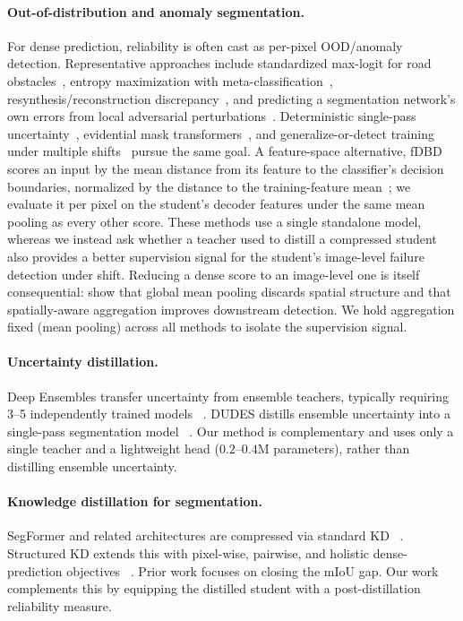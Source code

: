\documentclass{article}
\begin{document}
\paragraph{Out-of-distribution and anomaly segmentation.} For dense prediction, reliability is often cast as per-pixel OOD/anomaly detection. Representative approaches include standardized max-logit for road obstacles~\cite{jung2021standardized}, entropy maximization with meta-classification~\cite{chan2021entropy}, resynthesis/reconstruction discrepancy~\cite{dibiase2021pixel}, and predicting a segmentation network's own errors from local adversarial perturbations~\cite{besnier2021triggering}. Deterministic single-pass uncertainty~\cite{mukhoti2023deep}, evidential mask transformers~\cite{schmidt2025prior2former}, and generalize-or-detect training under multiple shifts~\cite{gao2024generalize} pursue the same goal. A feature-space alternative, fDBD scores an input by the mean distance from its feature to the classifier's decision boundaries, normalized by the distance to the training-feature mean~\cite{liu2024fdbd}; we evaluate it per pixel on the student's decoder features under the same mean pooling as every other score. These methods use a single standalone model, whereas we instead ask whether a teacher used to distill a compressed student also provides a better supervision signal for the student's image-level failure detection under shift. Reducing a dense score to an image-level one is itself consequential: \citet{guarino2026aggregation} show that global mean pooling discards spatial structure and that spatially-aware aggregation improves downstream detection. We hold aggregation fixed (mean pooling) across all methods to isolate the supervision signal.

\paragraph{Uncertainty distillation.} Deep Ensembles transfer uncertainty from ensemble teachers, typically requiring 3--5 independently trained models ~\cite{lakshminarayanan2017deepensembles}. DUDES distills ensemble uncertainty into a single-pass segmentation model ~\cite{landgraf2024dudes}. Our method is complementary and uses only a single teacher and a lightweight head ($0.2$--$0.4$M parameters), rather than distilling ensemble uncertainty.

\paragraph{Knowledge distillation for segmentation.} SegFormer and related architectures are compressed via standard KD ~\cite{hinton2015distilling, xie2021segformer}. Structured KD extends this with pixel-wise, pairwise, and holistic dense-prediction objectives ~\cite{liu2019structuredkd}. Prior work focuses on closing the mIoU gap. Our work complements this by equipping the distilled student with a post-distillation reliability measure.
\end{document}
